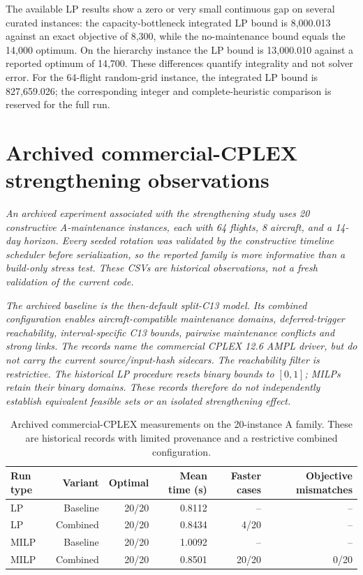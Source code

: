 The available LP results show a zero or very small continuous gap on several
curated instances: the capacity-bottleneck integrated LP bound is 8,000.013
against an exact objective of 8,300, while the no-maintenance bound equals the
14,000 optimum. On the hierarchy instance the LP bound is 13,000.010 against a
reported optimum of 14,700. These differences quantify integrality and not
solver error. For the 64-flight random-grid instance, the integrated LP bound
is 827,659.026; the corresponding integer and complete-heuristic comparison is
reserved for the full run.

\section{Archived commercial-CPLEX strengthening observations}
\label{sec:computational_current_strengthening}

\textit{An archived experiment associated with the strengthening study uses
20 constructive A-maintenance instances, each
with 64 flights, 8 aircraft, and a 14-day horizon. Every seeded rotation was
validated by the constructive timeline scheduler before serialization, so the
reported family is more informative than a build-only stress test. These CSVs
are historical observations, not a fresh validation of the current code.}

\textit{The archived baseline is the then-default split-C13 model. Its combined
configuration enables aircraft-compatible maintenance domains, deferred-trigger
reachability, interval-specific C13 bounds, pairwise maintenance conflicts and
strong links. The records name the commercial CPLEX 12.6 AMPL driver, but do
not carry the current source/input-hash sidecars. The reachability filter is
restrictive. The historical LP procedure resets binary bounds to $[0,1]$;
MILPs retain their binary domains. These records therefore do not independently
establish equivalent feasible sets or an isolated strengthening effect.}

\begin{table}[t]
\centering\small
\caption{Archived commercial-CPLEX measurements on the 20-instance A family.
These are historical records with limited provenance and a restrictive combined configuration.}
\label{tab:current_strengthening_cplex}
\begin{tabular}{lrrrrr}
\toprule
Run type & Variant & Optimal & Mean time (s) & Faster cases & Objective mismatches \\
\midrule
LP & Baseline & 20/20 & 0.8112 & -- & -- \\
LP & Combined & 20/20 & 0.8434 & 4/20 & -- \\
MILP & Baseline & 20/20 & 1.0092 & -- & -- \\
MILP & Combined & 20/20 & 0.8501 & 20/20 & 0/20 \\
\bottomrule
\end{tabular}
\end{table}

